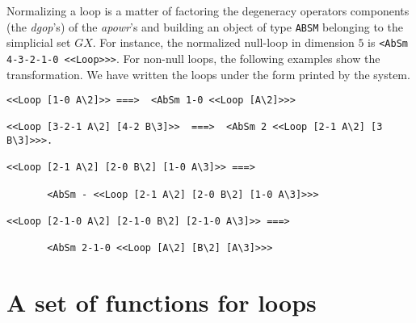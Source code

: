 Normalizing a loop is a matter of factoring the degeneracy operators
components (the {\em dgop}'s) of the
{\em apowr}'s and building an  object of type {\tt ABSM}  belonging to the simplicial set $GX$.
For instance, the normalized null-loop in dimension $5$ is {\tt <AbSm 4-3-2-1-0 <<Loop>>>}. For non-null
loops, the following examples show the transformation. We have written the loops under the form printed by the
system.
{\footnotesize\begin{verbatim}
<<Loop [1-0 A\2]>> ===>  <AbSm 1-0 <<Loop [A\2]>>>

<<Loop [3-2-1 A\2] [4-2 B\3]>>  ===>  <AbSm 2 <<Loop [2-1 A\2] [3 B\3]>>>.

<<Loop [2-1 A\2] [2-0 B\2] [1-0 A\3]>> ===>

       <AbSm - <<Loop [2-1 A\2] [2-0 B\2] [1-0 A\3]>>>

<<Loop [2-1-0 A\2] [2-1-0 B\2] [2-1-0 A\3]>> ===>

       <AbSm 2-1-0 <<Loop [A\2] [B\2] [A\3]>>>
\end{verbatim}}

\section{A set of functions for loops}

